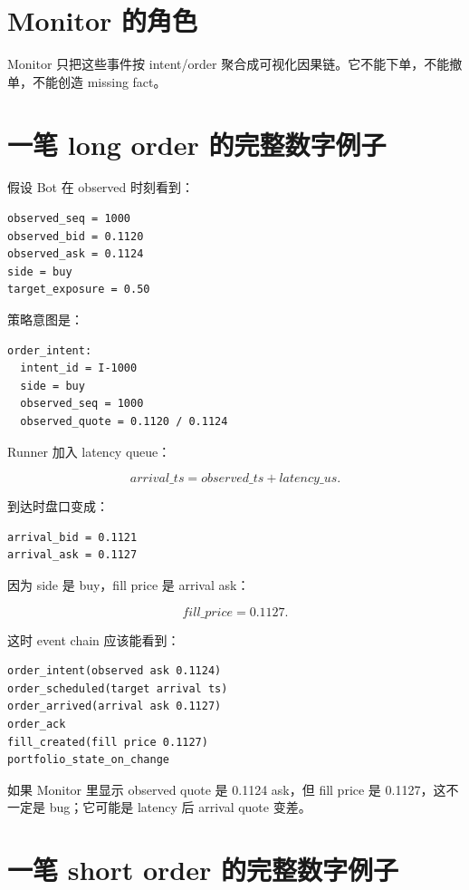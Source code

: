 \section{Monitor 的角色}

Monitor 只把这些事件按 intent/order 聚合成可视化因果链。它不能下单，不能撤单，不能创造 missing fact。


\section{一笔 long order 的完整数字例子}

假设 Bot 在 observed 时刻看到：

\begin{lstlisting}
observed_seq = 1000
observed_bid = 0.1120
observed_ask = 0.1124
side = buy
target_exposure = 0.50
\end{lstlisting}

策略意图是：

\begin{lstlisting}
order_intent:
  intent_id = I-1000
  side = buy
  observed_seq = 1000
  observed_quote = 0.1120 / 0.1124
\end{lstlisting}

Runner 加入 latency queue：

\[
arrival\_ts=observed\_ts+latency\_us.
\]

到达时盘口变成：

\begin{lstlisting}
arrival_bid = 0.1121
arrival_ask = 0.1127
\end{lstlisting}

因为 side 是 buy，fill price 是 arrival ask：

\[
fill\_price=0.1127.
\]

这时 event chain 应该能看到：

\begin{lstlisting}
order_intent(observed ask 0.1124)
order_scheduled(target arrival ts)
order_arrived(arrival ask 0.1127)
order_ack
fill_created(fill price 0.1127)
portfolio_state_on_change
\end{lstlisting}

如果 Monitor 里显示 observed quote 是 0.1124 ask，但 fill price 是 0.1127，这不一定是 bug；它可能是 latency 后 arrival quote 变差。

\section{一笔 short order 的完整数字例子}

